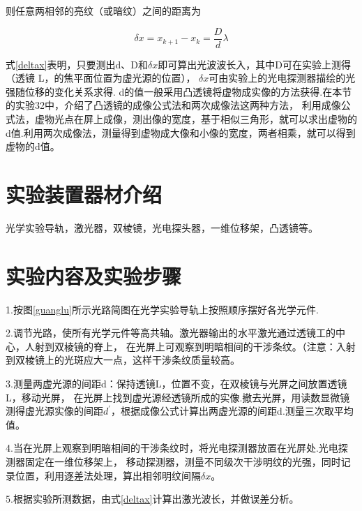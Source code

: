 \documentclass{ctexart}
\begin{document}
则任意两相邻的亮纹（或暗纹）之间的距离为

\begin{equation}\label{deltax}
  \delta x = x_{k+1} - x_{k} = \frac{D}{d} \lambda
\end{equation}

式\ref{deltax}表明，只要测出d、D和$\delta x$即可算出光波波长入，其中D可在实验上测得（透镜 L，的焦平面位置为虚光源的位置），
$\delta x$可由实验上的光电探测器描绘的光强随位移的变化关系求得.
d的值一般采用凸透镜将虚物成实像的方法获得.在本节的实验32中，介绍了凸透镜的成像公式法和两次成像法这两种方法，
利用成像公式法，虚物光点在屏上成像，测出像的宽度，基于相似三角形，就可以求出虚物的d值.利用两次成像法，测量得到虚物成大像和小像的宽度，两者相乘，就可以得到虚物的d值。

\section{实验装置器材介绍}
光学实验导轨，激光器，双棱镜，光电探头器，一维位移架，凸透镜等。

\section{实验内容及实验步骤}
1.按图\ref{guanglu}所示光路简图在光学实验导轨上按照顺序摆好各光学元件.

2.调节光路，使所有光学元件等高共轴。激光器输出的水平激光通过透镜工的中心，人射到双棱镜的脊上，
在光屏上可观察到明暗相间的干涉条纹。（注意：入射到双棱镜上的光斑应大一点，这样干涉条纹质量较高。

3.测量两虚光源的间距d：保持透镜L，位置不变，在双棱镜与光屏之间放置透镜L，移动光屏，
在光屏上找到虚光源经透镜所成的实像.撤去光屏，用读数显微镜测得虚光源实像的间距$d^{'}$，根据成像公式计算出两虚光源的间距d.测量三次取平均值。

4.当在光屏上观察到明暗相间的干涉条纹时，将光电探测器放置在光屏处.光电探测器固定在一维位移架上，
移动探测器，测量不同级次干涉明纹的光强，同时记录位置，利用逐差法处理，算出相邻明纹间隔$\delta x$。

5.根据实验所测数据，由式\ref{deltax}计算出激光波长，并做误差分析。
\newpage
\end{document}

